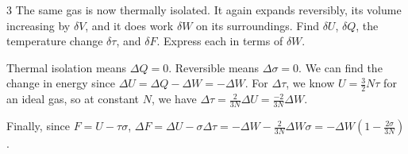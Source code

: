 \documentclass[11pt]{article}
\begin{document}
\begin{problem}{3}
The same gas is now thermally isolated.
It again expands reversibly, its volume increasing by \( \delta V \), and it does work \( \delta W \) on its surroundings.
Find \( \delta U \), \( \delta Q \), the temperature change \( \delta\tau \), and \( \delta F \).
Express each in terms of \( \delta W \).
\end{problem}
\begin{answer}
  Thermal isolation means \(\Delta Q = 0\).
  Reversible means \(\Delta \sigma = 0\).
  We can find the change in energy since \( \Delta U = \Delta Q - \Delta W = -\Delta W \).
  For \(\Delta \tau\), we know \( U = \frac{3}{2}N \tau \) for an ideal gas, so at constant \( N \), we have \( \Delta\tau = \frac{2}{3N}\Delta U = \frac{-2}{3N}\Delta W \).

  Finally, since \( F = U - \tau\sigma \), \(\Delta F = \Delta U - \sigma \Delta \tau = -\Delta W - \frac{2}{3N}\Delta W \sigma = -\Delta W(1 - \frac{2\sigma}{3N})\).
\end{answer}
\end{document}
